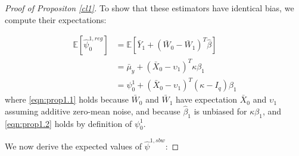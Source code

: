 \begin{proof}[Proof of Propositon \ref{cl1}]
To show that these estimators have identical bias, we compute their expectations:

\begin{align}
\nonumber	\mathbb{E}[\hat{\psi}_0^{1,reg}] &= \mathbb{E}[ \bar{Y}_1 + (\bar{W}_0 - \bar{W}_1)^T \hat{\beta}] \\
	& = \bar{\mu}_y + (\bar{X}_0 - \upsilon_1)^T\kappa\beta_1 \label{eqn:prop1.1}\\
	& = \psi_0^1 + (\bar{X}_0 - \upsilon_1)^T(\kappa - I_q)\beta_1 \label{eqn:prop1.2}
\end{align}
where \eqref{eqn:prop1.1} holds because $\bar{W}_0$ and $\bar{W}_1$ have expectation $\bar{X}_0$ and $\upsilon_1$ assuming additive zero-mean noise, and because $\hat{\beta}_1$ is unbiased for $\kappa\beta_1$, and \eqref{eqn:prop1.2} holds by definition of $\psi_0^1$.

We now derive the expected values of $\hat{\psi}^{1, sbw}$:


\end{proof}
